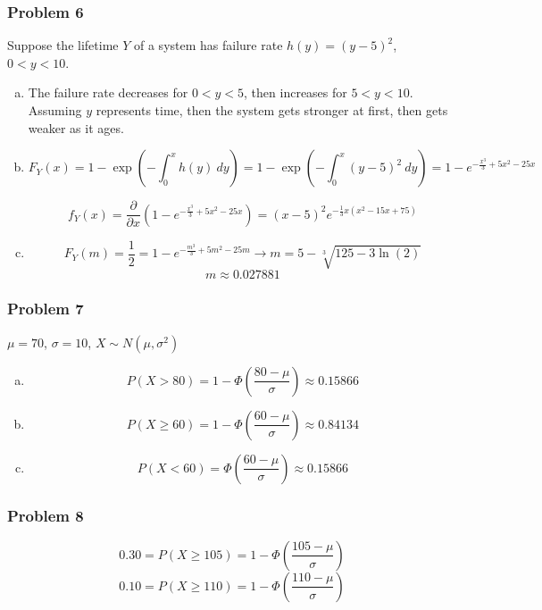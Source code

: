\documentclass[11pt]{extarticle}
\begin{document}
\subsubsection*{Problem 6}


Suppose the lifetime $Y$ of a system has failure rate $h(y) = (y-5)^2$, $0<y<10$.

\begin{enumerate}[(a)]
\item The failure rate decreases for $0<y<5$, then increases for $5<y<10$.  Assuming $y$ represents time, then the system gets stronger at first, then gets weaker as it ages.

\item $$F_Y(x) = 1 - \exp \left( -\int_0^x h(y)\ dy \right) = 1 - \exp \left( -\int_0^x (y-5)^2\ dy \right) = \boxed{ 1 - e^{-\frac{x^3}{3} + 5x^2 -25x} }$$

$$ f_Y(x) = \frac{\partial}{\partial x} \left( 1 - e^{-\frac{x^3}{3} + 5x^2 -25x} \right) = \boxed{ (x-5)^2e^{-\frac{1}{3}x (x^2-15x+75)} } $$

\item $$F_Y(m) = \frac{1}{2}  = 1 - e^{-\frac{m^3}{3} + 5m^2 -25m} \rightarrow m = 5 - \sqrt[3]{125 - 3\ln(2)} $$ $$ \boxed{m \approx 0.027881} $$

\end{enumerate}


\subsubsection*{Problem 7}

$\mu = 70$, $\sigma=10$, $X \sim N(\mu, \sigma^2)$

\begin{enumerate}[(a)]
\item $$P(X > 80) = 1 - \Phi \left( \frac{80-\mu}{\sigma} \right) \approx \boxed{ 0.15866 } $$
\item $$P(X \geq 60) = 1 - \Phi \left( \frac{60-\mu}{\sigma} \right) \approx \boxed{ 0.84134 } $$
\item $$P(X < 60) = \Phi \left( \frac{60-\mu}{\sigma} \right) \approx \boxed{ 0.15866 }$$
\end{enumerate}

\subsubsection*{Problem 8}

$$0.30 = P(X \geq 105) = 1- \Phi \left( \frac{105-\mu}{\sigma} \right)  $$ $$0.10 = P(X \geq 110) = 1 - \Phi \left( \frac{110-\mu}{\sigma} \right)  $$
\end{document}
